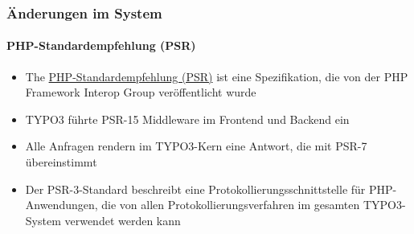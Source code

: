 
\begin{frame}[fragile]
	\frametitle{Änderungen im System}
	\framesubtitle{PHP-Standardempfehlung (PSR)}

	\begin{itemize}
		\item The
			\href{https://www.php-fig.org/psr/}{PHP-Standardempfehlung (PSR)}
			ist eine Spezifikation, die von der PHP Framework Interop Group veröffentlicht wurde
		\item TYPO3 führte PSR-15 Middleware im Frontend und Backend ein
		\item Alle Anfragen rendern im TYPO3-Kern eine Antwort, die mit PSR-7 übereinstimmt 
		\item Der PSR-3-Standard beschreibt eine Protokollierungsschnittstelle für PHP-Anwendungen,
			die von allen Protokollierungsverfahren im gesamten TYPO3-System verwendet
			werden kann
	\end{itemize}

\end{frame}

